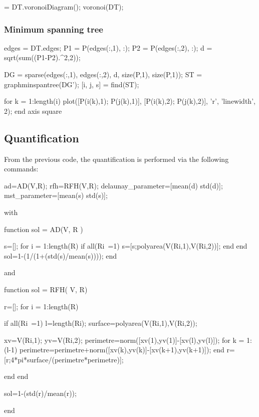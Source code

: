 \begin{matlab}
[V, R] = DT.voronoiDiagram();
voronoi(DT);
\end{matlab}

\subsubsection{Minimum spanning tree}
\begin{matlab}
edges = DT.edges;
P1 = P(edges(:,1), :);
P2 = P(edges(:,2), :);
d = sqrt(sum((P1-P2).^2,2));

DG = sparse(edges(:,1), edges(:,2), d, size(P,1), size(P,1));
ST = graphminspantree(DG');
[i, j, s] = find(ST);

for k = 1:length(i)
    plot([P(i(k),1); P(j(k),1)], [P(i(k),2); P(j(k),2)], 'r', 'linewidth', 2);
end
axis square
\end{matlab}

\subsection{Quantification}
From the previous code, the quantification is performed via the following commands:
\begin{matlab}
ad=AD(V,R);
rfh=RFH(V,R);
delaunay_parameter=[mean(d) std(d)];
mst_parameter=[mean(s) std(s)];
\end{matlab}

with
\begin{matlab}
function sol = AD(V, R )

s=[];
 for i = 1:length(R) 
    if all(R{i}~=1)   %
    s=[s;polyarea(V(R{i},1),V(R{i},2))];
    end
 end
 sol=1-(1/(1+(std(s)/mean(s))));
end
\end{matlab}
and
\begin{matlab}
function sol = RFH( V, R)

r=[];
for i = 1:length(R)
    
    if all(R{i}~=1)   %
        l=length(R{i});
        surface=polyarea(V(R{i},1),V(R{i},2));
        
        xv=V(R{i},1);
        yv=V(R{i},2);
        perimetre=norm([xv(1),yv(1)]-[xv(l),yv(l)]);
        for k = 1:(l-1)
            perimetre=perimetre+norm([xv(k),yv(k)]-[xv(k+1),yv(k+1)]);
        end
        r=[r;4*pi*surface/(perimetre*perimetre)];
        
    end
end

sol=1-(std(r)/mean(r));

end
\end{matlab}

